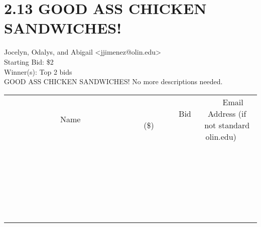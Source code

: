 \documentclass[11pt]{article}
\begin{document}
					\section*{2.13 GOOD ASS CHICKEN SANDWICHES!}
					Jocelyn, Odalys, and Abigail <jjimenez@olin.edu> \\
					Starting Bid: \$2 \\
					Winner(s): Top 2 bids \\
					GOOD ASS CHICKEN SANDWICHES! No more descriptions needed. \\
					[6ex]
					\begin{tabular}{c c c}
						~~~~~~~~~~~~~Name~~~~~~~~~~~~~ & ~~~~~~~~~Bid (\$)~~~~~~~~~ & ~~~Email Address (if not standard olin.edu)~~~ \\
				
 & & \\
\hline
 & & \\
\hline
 & & \\
\hline
 & & \\
\hline
 & & \\
\hline
 & & \\
\hline
 & & \\
\hline
 & & \\
\hline
 & & \\
\hline
 & & \\
\hline
 & & \\
\hline
 & & \\
\hline
 & & \\
\hline
 & & \\
\hline
 & & \\
\hline
 & & \\
\hline
 & & \\
\hline
 & & \\
\hline
 & & \\
\hline
 & & \\
\hline
 & & \\
\hline
 & & \\
\hline
 & & \\
\hline
 & & \\
\hline
 & & \\
\hline
 & & \\
\hline
					\end{tabular}
					\clearpage
				
\end{document}
